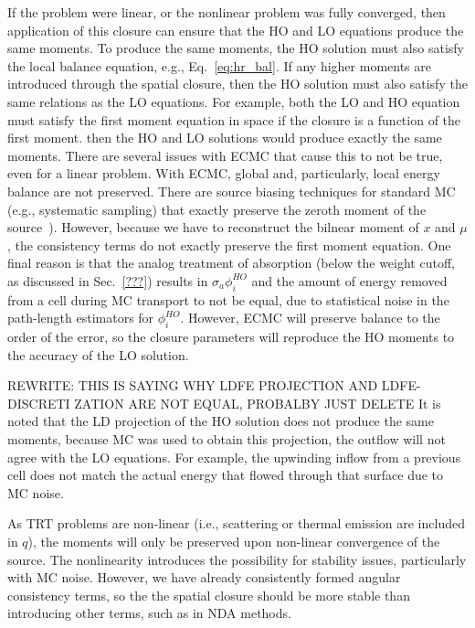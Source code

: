 If the problem were linear, or the nonlinear problem was fully converged,
then application of this closure can ensure that the HO and LO equations produce the same moments.  To produce the
same moments, the HO solution must also satisfy the local balance equation, e.g.,
Eq.~\eqref{eq:hr_bal}.  If any higher moments are introduced through the spatial closure,
then the HO solution must also satisfy the same relations as the LO equations.  For example, both the LO and HO equation must satisfy the
first moment equation in space if the closure is a function of the first moment.  
then the HO and LO solutions would produce exactly the same moments.  There are
several issues with ECMC that cause this to not be true, even for a linear problem.
With ECMC, global and, particularly, local energy balance are not preserved.  There
are source biasing techniques for standard MC (e.g., systematic
sampling) that exactly preserve the zeroth moment of the
source~\cite{shultis_mc,wollaber_review}). 
However, because we have to reconstruct the bilnear moment
of $x$ and $\mu$, the consistency terms do not exactly preserve the first moment
equation.  One final reason is that the analog treatment of absorption (below the weight
cutoff, as discussed in Sec.~\ref{???}) results in $\sigma_a \phi^{HO}_i$ and the amount
of energy removed from a cell during MC transport to not be equal, due to statistical noise in the
path-length estimators for $\phi^{HO}_i$.  However, ECMC will preserve
balance to the order of the error, so the closure parameters will
reproduce the HO moments to the accuracy of the LO solution.

REWRITE:  THIS IS SAYING WHY LDFE PROJECTION AND LDFE-DISCRETI ZATION ARE NOT EQUAL,
PROBALBY JUST DELETE
It is noted that the LD projection of the HO solution does not produce the same moments, because
MC was used to obtain this projection, the outflow will not agree with the LO equations.
For example, the upwinding inflow from a previous cell does not match the actual energy
that flowed through that surface due to MC noise.



As TRT problems are non-linear (i.e., scattering or thermal emission are included in
$q$), the moments will only be preserved upon non-linear convergence of the source.  The
nonlinearity introduces the possibility for stability
issues, particularly with MC noise.  However, we have already consistently formed angular consistency terms, so the
the spatial closure should be more stable than introducing other terms, such as
in NDA methods. 


